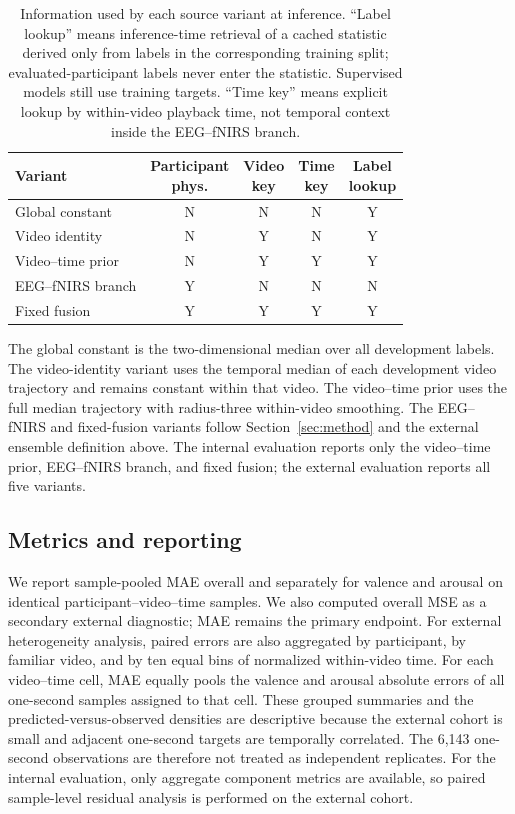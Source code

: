 \begin{table}[H]
  \caption{Information used by each source variant at inference. ``Label
  lookup'' means inference-time retrieval of a cached statistic derived only
  from labels in the corresponding training split; evaluated-participant
  labels never enter the statistic. Supervised models still use training
  targets. ``Time key'' means explicit lookup by within-video playback time,
  not temporal context inside the EEG--fNIRS branch.}
  \label{tab:source-variants}
  \centering
  \scriptsize
  \setlength{\tabcolsep}{3.1pt}
  \begin{tabular}{@{}lcccc@{}}
    \toprule
    Variant &
    \shortstack{Participant\\phys.} &
    \shortstack{Video\\key} &
    \shortstack{Time\\key} &
    \shortstack{Label\\lookup} \\
    \midrule
    Global constant & N & N & N & Y \\
    Video identity & N & Y & N & Y \\
    Video--time prior & N & Y & Y & Y \\
    EEG--fNIRS branch & Y & N & N & N \\
    Fixed fusion & Y & Y & Y & Y \\
    \bottomrule
  \end{tabular}
\end{table}

The global constant is the two-dimensional median over all development labels.
The video-identity variant uses the temporal median of each development video
trajectory and remains constant within that video. The video--time prior uses
the full median trajectory with radius-three within-video smoothing. The
EEG--fNIRS and fixed-fusion variants follow Section~\ref{sec:method} and the
external ensemble definition above. The internal evaluation reports only the video--time prior, EEG--fNIRS branch,
and fixed fusion; the external evaluation reports all five variants.

\subsection{Metrics and reporting}

We report sample-pooled MAE overall and separately for valence and arousal on
identical participant--video--time samples. We also computed overall MSE as a
secondary external diagnostic; MAE remains the primary endpoint. For external
heterogeneity analysis, paired errors are also aggregated by participant, by
familiar video,
and by ten equal bins of normalized within-video time. For each video--time
cell, MAE equally pools the valence and arousal absolute errors of all
one-second samples assigned to that cell. These grouped summaries and the
predicted-versus-observed densities are descriptive because the external cohort
is small and adjacent one-second targets are temporally correlated. The 6,143
one-second observations are therefore not treated as independent replicates.
For the internal evaluation, only aggregate component metrics are available,
so paired sample-level residual analysis is performed on the external cohort.

